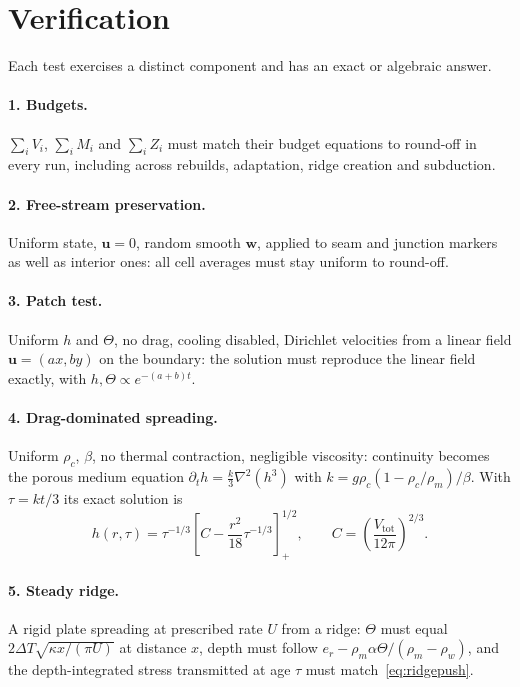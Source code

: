 \documentclass[11pt]{article}
\newcommand{\vect}[1]{\mathbf{#1}}
\begin{document}
\section{Verification}
\label{sec:verification}
Each test exercises a distinct component and has an exact or algebraic answer.

\paragraph{1. Budgets.} $\sum_iV_i$, $\sum_iM_i$ and $\sum_iZ_i$ must match their budget equations to round-off in every run, including across rebuilds, adaptation, ridge creation and subduction.

\paragraph{2. Free-stream preservation.} Uniform state, $\vect{u}=0$, random smooth $\vect{w}$, applied to seam and junction markers as well as interior ones: all cell averages must stay uniform to round-off.

\paragraph{3. Patch test.} Uniform $h$ and $\Theta$, no drag, cooling disabled, Dirichlet velocities from a linear field $\vect{u}=(ax,by)$ on the boundary: the solution must reproduce the linear field exactly, with $h,\Theta\propto e^{-(a+b)t}$.

\paragraph{4. Drag-dominated spreading.} Uniform $\rho_c$, $\beta$, no thermal contraction, negligible viscosity: continuity becomes the porous medium equation $\partial_th=\tfrac{k}{3}\nabla^2(h^3)$ with $k=g\rho_c(1-\rho_c/\rho_m)/\beta$. With $\tau=kt/3$ its exact solution is
\begin{equation}
  h(r,\tau)=\tau^{-1/3}\left[C-\frac{r^2}{18}\tau^{-1/3}\right]_+^{1/2},\qquad C=\left(\frac{V_{\mathrm{tot}}}{12\pi}\right)^{2/3}.
\end{equation}

\paragraph{5. Steady ridge.} A rigid plate spreading at prescribed rate $U$ from a ridge: $\Theta$ must equal $2\Delta T\sqrt{\kappa x/(\pi U)}$ at distance $x$, depth must follow $e_r-\rho_m\alpha\Theta/(\rho_m-\rho_w)$, and the depth-integrated stress transmitted at age $\tau$ must match~\eqref{eq:ridgepush}.
\end{document}
